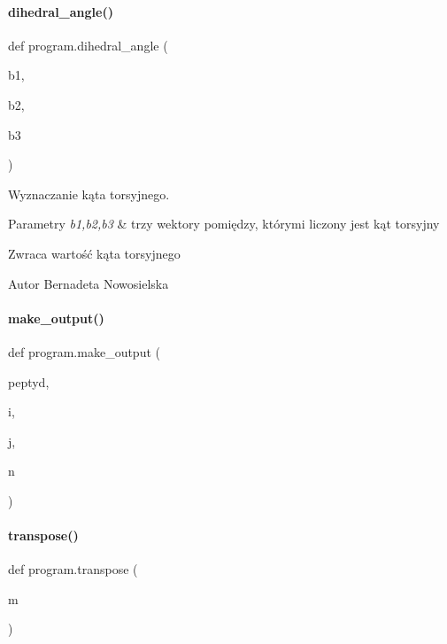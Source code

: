 \paragraph{dihedral\+\_\+angle()}
{\footnotesize\ttfamily def program.\+dihedral\+\_\+angle (\begin{DoxyParamCaption}\item[{}]{b1,  }\item[{}]{b2,  }\item[{}]{b3 }\end{DoxyParamCaption})}



Wyznaczanie kąta torsyjnego. 


\begin{DoxyParams}{Parametry}
{\em b1,b2,b3} & trzy wektory pomiędzy, którymi liczony jest kąt torsyjny \\
\hline
\end{DoxyParams}
\begin{DoxyReturn}{Zwraca}
wartość kąta torsyjnego 
\end{DoxyReturn}
\begin{DoxyAuthor}{Autor}
Bernadeta Nowosielska 
\end{DoxyAuthor}
\mbox{\label{namespaceprogram_aae1836affccc36f44e3567593c8cb8bd}} 
\paragraph{make\+\_\+output()}
{\footnotesize\ttfamily def program.\+make\+\_\+output (\begin{DoxyParamCaption}\item[{}]{peptyd,  }\item[{}]{i,  }\item[{}]{j,  }\item[{}]{n }\end{DoxyParamCaption})}

\mbox{\label{namespaceprogram_ae54249942e05f849b048953df9d84c04}} 
\paragraph{transpose()}
{\footnotesize\ttfamily def program.\+transpose (\begin{DoxyParamCaption}\item[{}]{m }\end{DoxyParamCaption})}




